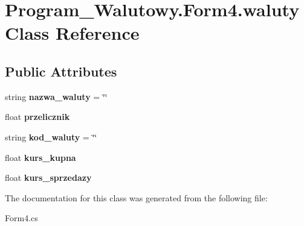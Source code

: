 \hypertarget{class_program___walutowy_1_1_form4_1_1waluty}{}\section{Program\+\_\+\+Walutowy.\+Form4.\+waluty Class Reference}
\label{class_program___walutowy_1_1_form4_1_1waluty}
\subsection*{Public Attributes}
\begin{DoxyCompactItemize}
\item 
\mbox{\label{class_program___walutowy_1_1_form4_1_1waluty_a4ed0992e6100075edbb1b7453ba10b7f}} 
string {\bfseries nazwa\+\_\+waluty} = \char`\"{}\char`\"{}
\item 
\mbox{\label{class_program___walutowy_1_1_form4_1_1waluty_a3f39b6c55a3c87543b158a604ae4b4eb}} 
float {\bfseries przelicznik}
\item 
\mbox{\label{class_program___walutowy_1_1_form4_1_1waluty_a8559ad234a45dc1a6c5d53793548565d}} 
string {\bfseries kod\+\_\+waluty} = \char`\"{}\char`\"{}
\item 
\mbox{\label{class_program___walutowy_1_1_form4_1_1waluty_ac505e9705e610df608cdc675e6c41e58}} 
float {\bfseries kurs\+\_\+kupna}
\item 
\mbox{\label{class_program___walutowy_1_1_form4_1_1waluty_a46c0376d3c81a1a92d23fd7d64793d65}} 
float {\bfseries kurs\+\_\+sprzedazy}
\end{DoxyCompactItemize}


The documentation for this class was generated from the following file\+:\begin{DoxyCompactItemize}
\item 
Form4.\+cs\end{DoxyCompactItemize}
